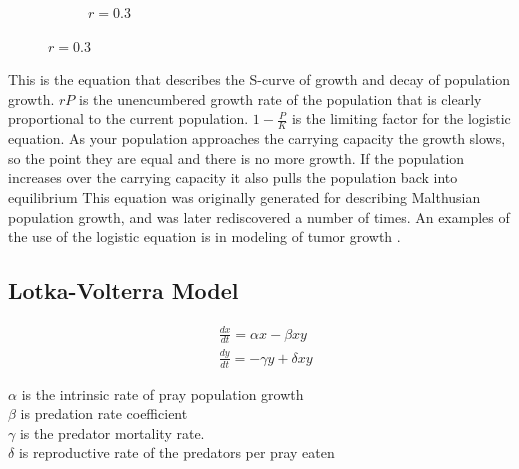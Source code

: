 \documentclass[12pt, letterpaper]{article}
\begin{document}
\begin{figure}[h]
\begin{subfigure}[b]{.3\linewidth}
    \caption{$r=0.3$}
  \end{subfigure}
\end{figure}

\newpage
This is the equation that describes the S-curve of growth and decay of population growth. $rP$ is the
unencumbered growth rate of the population that is clearly proportional to the current population.
$1- \frac{P}{K}$ is the limiting factor for the logistic equation. As your population approaches the carrying
capacity the growth slows, so the point they are equal and there is no more growth. If the population
increases over the carrying capacity it also pulls the population back into equilibrium This equation was
originally generated for describing Malthusian population growth, and was later rediscovered a number of
times. An examples of the use of the logistic equation is in modeling of tumor growth \citep{logisticTumor}.

\subsection{Lotka-Volterra Model} \label{lotkavolterra}
\begin{singlespace}
  \begin{equation}\label{eq:lotkaVolterra}
    \begin{split}
      &\frac{dx}{dt} = \alpha x - \beta x y \\
      &\frac{dy}{dt} = - \gamma y + \delta x y
    \end{split}
  \end{equation}
  \begin{small}
$\alpha$ is the intrinsic rate of pray population growth \\
$\beta$ is predation rate coefficient \\
$\gamma$ is the predator mortality rate. \\
$\delta$ is reproductive rate of the predators per pray eaten \\
  \end{small}
\end{singlespace}
\end{document}
